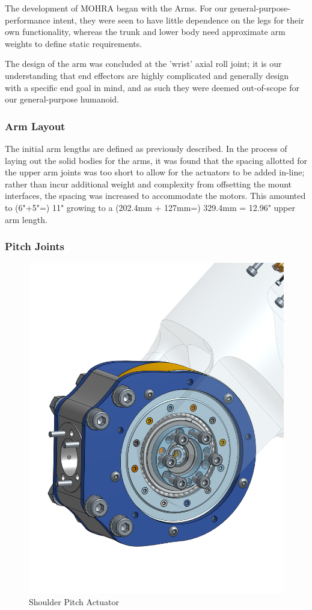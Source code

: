\documentclass{article}
\begin{document}
The development of MOHRA began with the Arms. For our general-purpose-performance intent, they were seen to have little dependence on the legs for their own functionality, whereas the trunk and lower body need approximate arm weights to define static requirements.  

The design of the arm was concluded at the 'wrist' axial roll joint; it is our understanding that end effectors are highly complicated and generally design with a specific end goal in mind, and as such they were deemed out-of-scope for our general-purpose humanoid.

\subsubsection{Arm Layout}

The initial arm lengths are defined as previously described. In the process of laying out the solid bodies for the arms, it was found that the spacing allotted for the upper arm joints was too short to allow for the actuators to be added in-line; rather than incur additional weight and complexity from offsetting the mount interfaces, the spacing was increased to accommodate the motors. This amounted to (6"+5"=) 11" growing to a (202.4mm + 127mm=) 329.4mm = 12.96" upper arm length.

\subsubsection{Pitch Joints}

\begin{figure}
    \centering
    \includegraphics[width=0.5\linewidth]{assets/MOHRA/Sub-Arm/ShoulderPitch_Front.png}
    \caption{Shoulder Pitch Actuator}
    \label{fig:enter-label}
\end{figure}
\end{document}
